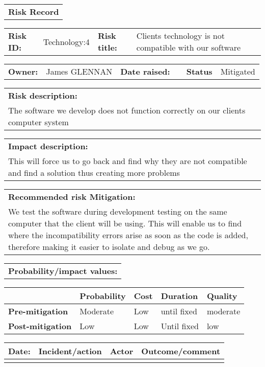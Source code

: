 \begin{table}
	\begin{tabularx}{\textwidth}{| X |}
		\hline
		\textbf{Risk Record} \\
	\end{tabularx}
	\begin{tabularx}{\textwidth}{| l | X | l | X |}
		\hline
		\textbf{Risk ID:} & Technology:4 & \textbf{Risk title:} & Clients technology is not compatible with our software \\
	\end{tabularx}
	\begin{tabularx}{\textwidth}{| l | X | l | X | l | X |}
		\hline
		\textbf{Owner:} & James GLENNAN & \textbf{Date raised:} &  & \textbf{Status} & Mitigated \\
	\end{tabularx}
	\begin{tabularx}{\textwidth}{| X |}
		\hline
		\textbf{Risk description:} \\ The software we develop does not function correctly on our clients computer system  \\
	\end{tabularx}
	\begin{tabularx}{\textwidth}{| X |}
		\hline
		\textbf{Impact description:} \\ This will force us to go back and find why they are not compatible and find a solution thus creating more problems \\
	\end{tabularx}
	\begin{tabularx}{\textwidth}{| X |}
		\hline
		\textbf{Recommended risk Mitigation:} \\ We test the software during development testing on the same computer that the client will be using. This will enable us to find where the incompatibility errors arise as soon as the code is added, therefore making it easier to isolate and debug as we go. \\
	\end{tabularx}
	\begin{tabularx}{\textwidth}{| X |}
		\hline
		\textbf{Probability/impact values:} \\
	\end{tabularx}
	\begin{tabularx}{\textwidth}{| l | l | X | X | X |}
		\hline
		 &  \textbf{Probability} & \textbf{Cost} & \textbf{Duration} & \textbf{Quality} \\ \hline
		\textbf{Pre-mitigation} & Moderate & Low & until fixed & moderate\\ \hline
		\textbf{Post-mitigation} & Low & Low & Until fixed & low \\ \hline \hline
	\end{tabularx}
	\begin{tabularx}{\textwidth}{| l | X | l | X |}
		\hline
		\textbf{Date:} & \textbf{Incident/action} & \textbf{Actor} & \textbf{Outcome/comment} \\ \hline
		 &  &  &  \\ \hline
	\end{tabularx}
\end{table}

